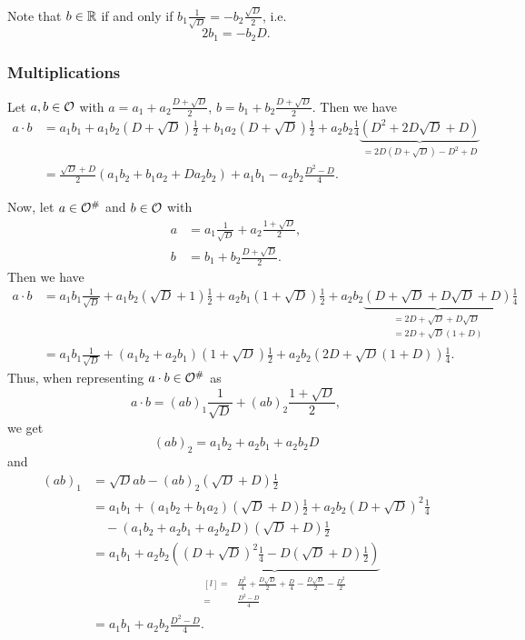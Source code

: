 Note that $b \in \mathbb{R}$ if and only if $b_1 \frac{1}{\sqrt{D}} = - b_2 \frac{\sqrt{D}}{2}$, i.e.
\[ 2 b_1 = - b_2 D . \]

\subsubsection{Multiplications}
Let $a,b \in \mathcal{O}$ with $a = a_1 + a_2 \frac{D + \sqrt{D}} {2}$, $b = b_1 + b_2 \frac{D + \sqrt{D}} {2}$. Then we have
\begin{align*}
a \cdot b &= a_1 b_1 + a_1 b_2 (D + \sqrt{D}) \tfrac{1}{2} + b_1 a_2 (D + \sqrt{D}) \tfrac{1}{2}
+ a_2 b_2 \tfrac{1}{4} \underbrace{(D^2 + 2 D \sqrt{D} + D)}_{= 2D (D + \sqrt{D}) - D^2 + D} \\
&= \frac{\sqrt{D} + D}{2} (a_1 b_2 + b_1 a_2 + D a_2 b_2)
+ a_1 b_1 - a_2 b_2 \frac{D^2 - D}{4} .
\end{align*}

Now, let $a \in \mathcal{O}^\#$ and $b \in \mathcal{O}$ with
\begin{align*}
a &= a_1 \frac{1}{\sqrt{D}} + a_2 \frac{1 + \sqrt{D}} {2} , \\
b &= b_1 + b_2 \frac{D + \sqrt{D}} {2} .
\end{align*}
Then we have
\begin{align*}
a \cdot b &= a_1 b_1 \tfrac{1}{\sqrt{D}} + a_1 b_2 (\sqrt{D} + 1) \tfrac{1}{2}
+ a_2 b_1 (1 + \sqrt{D}) \tfrac{1}{2} + a_2 b_2
\underbrace{(D + \sqrt{D} + D \sqrt{D} + D)}_{
\begin{aligned}
= 2D + \sqrt{D} + D \sqrt{D} \\
= 2D + \sqrt{D} (1 + D)
\end{aligned}
}
\tfrac{1}{4} \\
&= a_1 b_1 \tfrac{1}{\sqrt{D}} + (a_1 b_2 + a_2 b_1) (1 + \sqrt{D}) \tfrac{1}{2}
+ a_2 b_2 (2D + \sqrt{D}(1 + D)) \tfrac{1}{4} .
\end{align*}
Thus, when representing $a \cdot b \in \mathcal{O}^\#$ as
\[ a \cdot b = (ab)_1 \frac{1}{\sqrt{D}} + (ab)_2 \frac{1 + \sqrt{D}} {2} , \]
we get
\[ (ab)_2 = a_1 b_2 + a_2 b_1 + a_2 b_2 D \]
and
\begin{align*}
(ab)_1 &= \sqrt{D} ab - (ab)_2 (\sqrt{D} + D) \tfrac{1}{2} \\
&= a_1 b_1 + (a_1 b_2 + b_1 a_2) (\sqrt{D} + D) \tfrac{1}{2} + a_2 b_2 (D + \sqrt{D})^2 \tfrac{1}{4} \\
&\quad - (a_1 b_2 + a_2 b_1 + a_2 b_2 D) (\sqrt{D} + D) \tfrac{1}{2} \\
&= a_1 b_1 + a_2 b_2 \underbrace{( (D+\sqrt{D})^2 \tfrac{1}{4} - D(\sqrt{D}+D)\tfrac{1}{2} )}_{
\begin{aligned}[l]
=& \tfrac{D^2}{4} + \tfrac{D\sqrt{D}}{2} + \tfrac{D}{4} - \tfrac{D\sqrt{D}}{2} - \tfrac{D^2}{2} \\
=& \tfrac{D^2 - D}{4}
\end{aligned}
} \\
&= a_1 b_1 + a_2 b_2 \frac{D^2 - D}{4} .
\end{align*}

